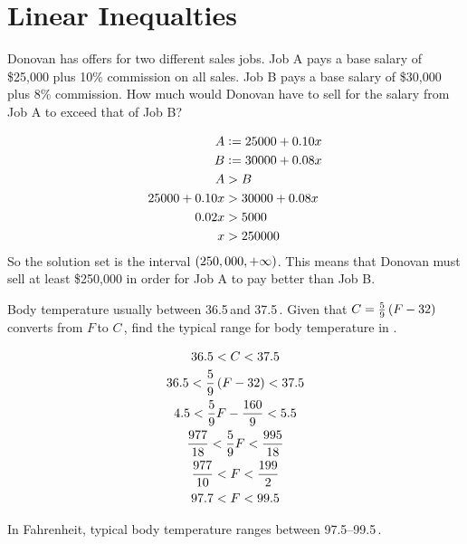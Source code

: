 \section{Linear Inequalties}
\begin{example}
	Donovan has offers for two different sales jobs. Job A pays a base 
	salary of \$25,000 plus 10\% commission on all sales. Job B pays a 
	base salary of \$30,000 plus 8\% commission. How much would 
	Donovan have to sell for the salary from Job A to exceed that of 
	Job B?
	
	\begin{align*}
		A & \vcentcolon= 25000 + 0.10 x \\
		B & \vcentcolon= 30000 + 0.08 x \\
		A & > B \\
		25000 + 0.10 x & > 30000 + 0.08 x \\
		0.02 x & > 5000 \\
		x & > 250000 \\
	\end{align*}
	So the solution set is the interval 
	\(\left( 250,000, +\infty\right)\). This means that Donovan must 
	sell at least \$250,000 in order for Job A to pay better than Job 
	B.
\end{example}

\begin{example}
	Body temperature usually between 36.5\,\celsius and 
	37.5\,\celsius. Given that \(C=\frac{5}{9} \left( F - 32\right)\) 
	converts from
	\(F\)\,\fahrenheit to \(C\)\,\celsius, find the typical range for 
	body temperature in \fahrenheit.
	
	\begin{gather}
		36.5 < C < 37.5 \\
		36.5 < \frac{5}{9}\left( F - 32\right) < 37.5 \\
		4.5 < \frac{5}{9} F - \frac{160}{9} < 5.5 \\
		\frac{977}{18} < \frac{5}{9} F < \frac{995}{18} \\
		\frac{977}{10} < F < \frac{199}{2} \\
		97.7 < F < 99.5 \\
	\end{gather}
	
	In Fahrenheit, typical body temperature ranges between 
	97.5--99.5\,\fahrenheit.
\end{example}

